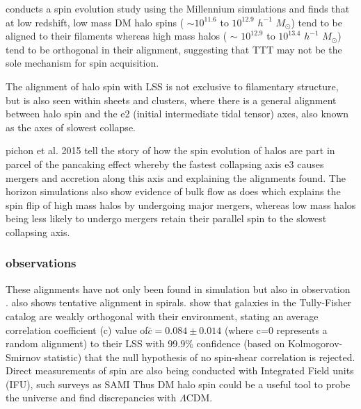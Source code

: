 \documentclass[a4paper,fleqn,usenatbib]{mnras}
\def \lcdm{$\Lambda$CDM}
\begin{document}
\citet{Trowland_13} conducts a spin evolution study using the Millennium simulations and finds that at low redshift, low mass DM halo spins ( $\sim$$10^{11.6}$ to $10^{12.9}$ $h^{-1}$ \(M_\odot\)) tend to be aligned to their filaments whereas high mass halos ( $\sim$ $10^{12.9}$ to $10^{13.4}$ $h^{-1}$ \(M_\odot\)) tend to be orthogonal in their alignment, suggesting that TTT may not be the sole mechanism for spin acquisition.  

The alignment of halo spin with LSS is not exclusive to filamentary structure, but is also seen within sheets and clusters, where there is a general alignment between halo spin and the e2 (initial intermediate tidal tensor) axes, also known as the axes of slowest collapse. \citep{Libeskind_12,Dubois_14,Calvo_14,Kang_15,Wang_17,Veena_18} 

\citet{Bond_96,Codis_12} pichon et al. 2015 tell the story of how the spin evolution of halos are part in parcel of the pancaking effect whereby the fastest collapsing axis e3 causes mergers and accretion along this axis and explaining the alignments found. The horizon simulations \citep{Dubois_14,Welker_14} also show evidence of bulk flow as does \citep{Trowland_13} which explains the spin flip of high mass halos by undergoing major mergers, whereas low mass halos being less likely to undergo mergers retain their parallel spin to the slowest collapsing axis.

\subsubsection{observations}
These alignments have not only been found in simulation but also in observation \citep{Jones_10}. \citet{Pen_00} also shows tentative alignment in spirals. 
\citet{Lee_Erdogdu_07} show that galaxies in the Tully-Fisher catalog are weakly orthogonal with their environment, stating an average correlation coefficient (c) value of$\bar{c}=0.084\pm 0.014$ (where c=0 represents a random alignment) to their LSS with 99.9$\%$ confidence (based on Kolmogorov-Smirnov statistic) that the null hypothesis of no spin-shear correlation is rejected. 
\\
Direct measurements of spin are also being conducted with Integrated Field units (IFU), such surveys as SAMI \citep{Croom_12} Thus DM halo spin could be a useful tool to probe the universe and find discrepancies with \lcdm.
\end{document}
